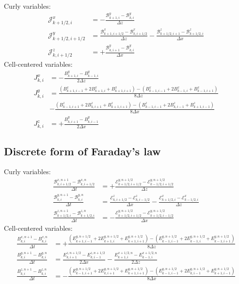 \documentclass{article}
\begin{document}
Curly variables:
\begin{align}
  \mathcal{J}^x_{k+1/2,i} &=
  -\frac{\mathcal{B}^y_{k+1,i} - \mathcal{B}^y_{k,i}}{\Delta z} \\
  \mathcal{J}^y_{k+1/2,i+1/2} &=
  \frac{\mathcal{B}^x_{k+1,i+1/2} - \mathcal{B}^x_{k,i+1/2}}{\Delta z} -
  \frac{\mathcal{B}^z_{k+1/2,i+1} - \mathcal{B}^z_{k+1/2,i}}{\Delta x} \\
  \mathcal{J}^z_{k,i+1/2} &=
  +\frac{\mathcal{B}^y_{k,i+1} - \mathcal{B}^y_{k,i}}{\Delta x}
\end{align}
Cell-centered variables:
\begin{align}
  J^x_{k,i} &= -\frac{B^y_{k+1,i} - B^y_{k-1,i}}{2\Delta z} \\
  J^y_{k,i} &=
  \frac{(B^x_{k+1,i-1} + 2 B^x_{k+1,i} + B^x_{k+1,i+1})
      - (B^x_{k-1,i-1} + 2 B^x_{k-1,i} + B^x_{k-1,i+1})}{8\Delta z}
      \nonumber\\ &-
  \frac{(B^z_{k-1,i+1} + 2 B^z_{k,i+1} + B^z_{k+1,i+1})
      - (B^z_{k-1,i-1} + 2 B^z_{k,i-1} + B^z_{k+1,i-1})}{8\Delta x} \\
  J^z_{k,i} &= +\frac{B^y_{k,i+1} - B^y_{k,i-1}}{2\Delta x}
\end{align}

\subsection{Discrete form of Faraday's law}
Curly variables:
\begin{align}
  \frac{\mathcal{B}^{x,n+1}_{k,i+1/2}
      - \mathcal{B}^{x,n  }_{k,i+1/2}}{\Delta t} &= +
  \frac{\mathcal{E}^{y,n+1/2}_{k+1/2,i+1/2}
      - \mathcal{E}^{y,n+1/2}_{k-1/2,i+1/2}}{\Delta z} \\
  \frac{\mathcal{B}^{y,n+1}_{k,i}
      - \mathcal{B}^{y,n  }_{k,i}}{\Delta t} &=
  \frac{\mathcal{E}^z_{k,i+1/2} - \mathcal{E}^z_{k,i-1/2}}{\Delta x} -
  \frac{\mathcal{E}^x_{k+1/2,i} - \mathcal{E}^x_{k-1/2,i}}{\Delta z} \\
  \frac{\mathcal{B}^{z,n+1}_{k+1/2,i}
      - \mathcal{B}^{z,n  }_{k+1/2,i}}{\Delta t} &= -
  \frac{\mathcal{E}^{y,n+1/2}_{k+1/2,i+1/2}
      - \mathcal{E}^{y,n+1/2}_{k+1/2,i-1/2}}{\Delta x}
\end{align}
Cell-centered variables:
\begin{align}
  \frac{B^{x,n+1}_{k,i} - B^{x,n}_{k,i}}{\Delta t} &=
  +\frac{
    (E^{y,n+1/2}_{k+1,i-1} + 2 E^{y,n+1/2}_{k+1,i} + E^{y,n+1/2}_{k+1,i+1}) -
    (E^{y,n+1/2}_{k-1,i-1} + 2 E^{y,n+1/2}_{k-1,i} + E^{y,n+1/2}_{k-1,i+1})}
    {8\Delta z} \\
  \frac{B^{y,n+1}_{k,i} - B^{y,n}_{k,i}}{\Delta t} &=
  \frac{E^{z,n+1/2}_{k,i+1} - E^{z,n+1/2}_{k,i-1}}{2\Delta x} -
  \frac{E^{x+1/2,n}_{k+1,i} - E^{x+1/2,n}_{k-1,i}}{2\Delta z} \\
  \frac{B^{z,n+1}_{k,i} - B^{z,n}_{k,i}}{\Delta t} &=
  -\frac{
    (E^{y,n+1/2}_{k-1,i+1} + 2 E^{y,n+1/2}_{k,i+1} + E^{y,n+1/2}_{k+1,i+1}) -
    (E^{y,n+1/2}_{k-1,i-1} + 2 E^{y,n+1/2}_{k,i-1} + E^{y,n+1/2}_{k+1,i-1})}
    {8\Delta x}
\end{align}
\end{document}
